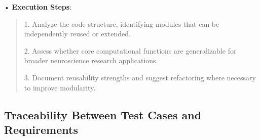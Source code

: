 \documentclass[
]{article}
\begin{document}
• \textbf{Execution Steps}:

\begin{quote}
1. Analyze the code structure, identifying modules that can be
independently reused or extended.

2. Assess whether core computational functions are generalizable for
broader neuroscience research applications.

3. Document reusability strengths and suggest refactoring where
necessary to improve modularity.
\end{quote}

\hypertarget{traceability-between-test-cases-and-requirements}{%
\subsection{Traceability Between Test Cases and
Requirements}\label{traceability-between-test-cases-and-requirements}}
\end{document}
